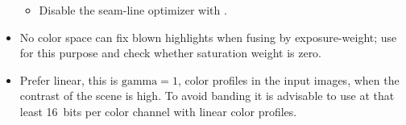 \begin{itemize}
\begin{itemize}
    \item
      Disable the seam-line optimizer with .
    \end{itemize}
\fi%

\ifenfuse
  \item
     No color space can fix blown highlights when
    fusing by exposure-weight; use
     for this purpose and check
    whether saturation weight is zero.
\fi%

  \item
    Prefer linear, this is $\mathrm{gamma} = 1$, color profiles in the input images, when the
    contrast of the scene is high.  To avoid banding it is advisable to use at that least
    16~bits per color channel with linear color profiles.

\end{itemize}



